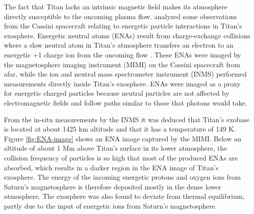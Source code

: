 \documentclass[12pt, parskip=full*, abstract]{scrartcl}
\begin{document}

The fact that Titan lacks an intrinsic magnetic field makes its atmosphere directly susceptible to the oncoming plasma flow. \textcite{titan-exosphere-interaction} analyzed some observations from the Cassini spacecraft relating to energetic particle interactions in Titan's exosphere. Energetic neutral atoms (ENAs) result from charge-exchange collisions where a slow neutral atom in Titan's atmosphere transfers an electron to an energetic +1 charge ion from the oncoming flow \parencite{titan-exosphere-interaction}. These ENAs were imaged by the magnetosphere imaging instrument (MIMI) on the Cassini spacecraft from afar, while the ion and neutral mass spectrometer instrument (INMS) performed measurements directly inside Titan's exosphere. ENAs were imaged as a proxy for energetic charged particles because neutral particles are not affected by electromagnetic fields and follow paths similar to those that photons would take. 

From the in-situ measurements by the INMS it was deduced that Titan's exobase is located at about 1425 km altitude and that it has a temperature of 149 K. Figure \ref{fig:ENA-image} shows an ENA image captured by the MIMI. Below an altitude of about 1 Mm above Titan's surface in its lower atmosphere, the collision frequency of particles is so high that most of the produced ENAs are absorbed, which results in a darker region in the ENA image of Titan's exosphere. The energy of the incoming energetic protons and oxygen ions from Saturn's magnetosphere is therefore deposited mostly in the dense lower atmosphere. The exosphere was also found to deviate from thermal equilibrium, partly due to the input of energetic ions from Saturn's magnetosphere.
\end{document}
